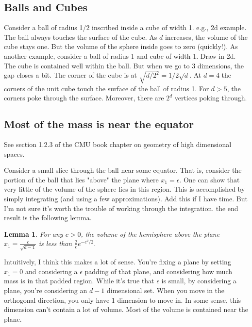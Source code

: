 \documentclass{book}
\newtheorem{lemma}{Lemma}
\begin{document}



\subsection{Balls and Cubes}
Consider a ball of radius 1/2 inscribed inside a cube of width 1. e.g., 2d example. The ball always touches the surface of the cube. As $d$ increases, the volume of the cube stays one. But the volume of the sphere inside goes to zero (quickly!). As another example, consider a ball of radius 1 and cube of width 1. Draw in 2d. The cube is contained well within the ball. But when we go to 3 dimensions, the gap closes a bit. The corner of the cube is at $\sqrt{d/2^2} = 1/2\sqrt{d}$. At $d=4$ the corners of the unit cube touch the surface of the ball of radius 1. For $d>5$, the corners poke through the surface. Moreover, there are $2^d$ vertices poking through. 


\subsection{Most of the mass is near the equator}
See section 1.2.3 of the CMU book chapter on geometry of high dimensional spaces. 

Consider a small slice through the ball near some equator. That is, consider the portion of the ball that lies "above" the plane where $x_1 = \epsilon$. One can show that very little of the volume of the sphere lies in this region. This is accomplished by simply integrating (and using a few approximations). Add this if I have time. But I'm not sure it's worth the trouble of working through the integration. the end result is the following lemma. 
\begin{lemma}
For any $c>0$, the volume of the hemisphere above the plane $x_1 = \frac{c}{\sqrt{d-1}}$ is less than $\frac{2}{c}e^{-c^2/2}$. 
\end{lemma}
Intuitively, I think this makes a lot of sense. You're fixing a plane by setting $x_1=0$ and considering a $\epsilon$ padding of that plane, and considering how much mass is in that padded region. While it's true that $\epsilon$ is small, by considering a plane, you're considering an $d-1$ dimensional set. When you move in the orthogonal direction, you only have 1 dimension to move in. In some sense, this dimension can't contain a lot of volume. Most of the volume is contained near the plane. 
\end{document}
